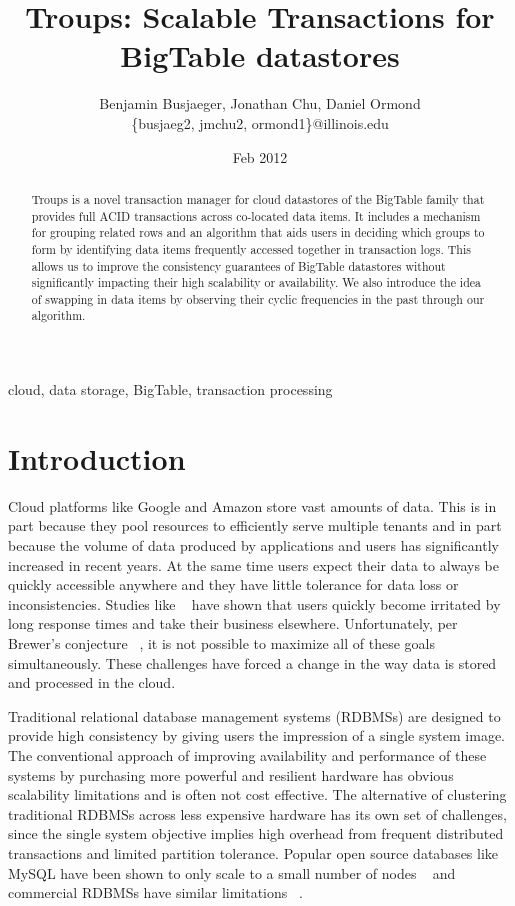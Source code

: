 \documentclass[10pt,final,journal]{IEEEtran}
\begin{document}
\title{Troups: Scalable Transactions for BigTable datastores}
\author{Benjamin Busjaeger, Jonathan Chu, Daniel Ormond \\
\{busjaeg2, jmchu2, ormond1\}@illinois.edu}
\date{Feb 2012}
\maketitle

\begin{abstract}
Troups is a novel transaction manager for cloud datastores of the BigTable family that provides full ACID transactions across co-located data items. It includes a mechanism for grouping related rows and an algorithm that aids users in deciding which groups to form by identifying data items frequently accessed together in transaction logs. This allows us to improve the consistency guarantees of BigTable datastores without significantly impacting their high scalability or availability. We also introduce the idea of swapping in data items by observing their cyclic frequencies in the past through our algorithm.
\end{abstract}

\begin{IEEEkeywords}
cloud, data storage, BigTable, transaction processing
\end{IEEEkeywords}

\section{Introduction}
Cloud platforms like Google and Amazon store vast amounts of data. This is in part because they pool resources to efficiently serve multiple tenants and in part because the volume of data produced by applications and users has significantly increased in recent years. At the same time users expect their data to always be quickly accessible anywhere and they have little tolerance for data loss or inconsistencies. Studies like ~\cite{Ramsay:1998} have shown that users quickly become  irritated by long response times and take their business elsewhere. Unfortunately, per Brewer's conjecture ~\cite{gilbert2002brewer}, it is not possible to maximize all of these goals simultaneously. These challenges have forced a change in the way data is stored and processed in the cloud.

Traditional relational database management systems (RDBMSs) are designed to provide high consistency by giving users the impression of a single system image. The conventional approach of improving availability and performance of these systems by purchasing more powerful and resilient hardware has obvious scalability limitations and is often not cost effective. The alternative of clustering traditional RDBMSs across less expensive hardware has its own set of challenges, since the single system objective implies high overhead from frequent distributed transactions and limited partition tolerance. Popular open source databases like MySQL have been shown to only scale to a small number of nodes ~\cite{Malkowski:2010:EAD:1774088.1774449} and commercial RDBMSs have similar limitations ~\cite{Campbell:2010:ESF:1807167.1807280}.
\end{document}
